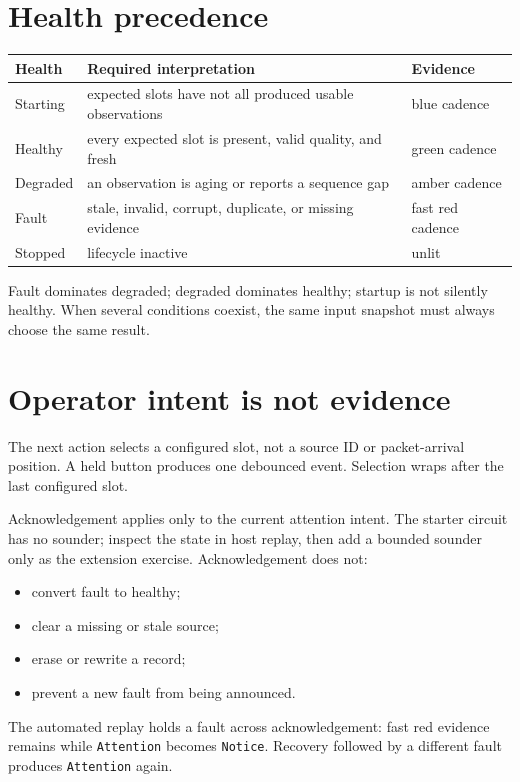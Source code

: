 \documentclass[11pt]{article}
\begin{document}
\section{Health precedence}

\begin{tabularx}{\linewidth}{@{}l X X@{}}
\toprule
Health & Required interpretation & Evidence\\
\midrule
Starting & expected slots have not all produced usable observations & blue cadence\\
Healthy & every expected slot is present, valid quality, and fresh & green cadence\\
Degraded & an observation is aging or reports a sequence gap & amber cadence\\
Fault & stale, invalid, corrupt, duplicate, or missing evidence & fast red cadence\\
Stopped & lifecycle inactive & unlit\\
\bottomrule
\end{tabularx}

Fault dominates degraded; degraded dominates healthy; startup is not silently
healthy. When several conditions coexist, the same input snapshot must always
choose the same result.

\section{Operator intent is not evidence}

The next action selects a configured slot, not a source ID or packet-arrival
position. A held button produces one debounced event. Selection wraps after
the last configured slot.

Acknowledgement applies only to the current attention intent. The starter
circuit has no sounder; inspect the state in host replay, then add a bounded
sounder only as the extension exercise. Acknowledgement does not:

\begin{itemize}
  \item convert fault to healthy;
  \item clear a missing or stale source;
  \item erase or rewrite a record;
  \item prevent a new fault from being announced.
\end{itemize}

The automated replay holds a fault across acknowledgement: fast red evidence
remains while \texttt{Attention} becomes \texttt{Notice}. Recovery followed by
a different fault produces \texttt{Attention} again.
\end{document}
